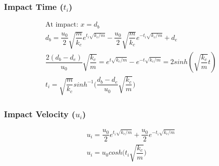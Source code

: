 \documentclass[10pt,a4paper,titlepage]{report}
\begin{document}
\subsubsection{Impact Time ($t_i$)}
\begin{align*}
&\text{At impact: } x = d_b \\
&d_b = \dfrac{u_0}{2} \sqrt{\dfrac{m}{k_c}} e^{t_i \sqrt{k_c / m}} - \dfrac{u_0}{2} \sqrt{\dfrac{m}{k_c}} e^{- t_i \sqrt{k_c / m}} + d_e \\
&\dfrac{2(d_b - d_e)}{u_0} \sqrt{\dfrac{k_c}{m}} = e^{t \sqrt{k_c / m}} - e^{-t \sqrt{k_c / m}}  = 2 sinh(\sqrt{\dfrac{k_c}{m}} t) \\
&t_i = \sqrt{\dfrac{m}{k_c}} sinh^{-1}\Bigg(\dfrac{d_b - d_e}{u_0} \sqrt{\dfrac{k_c}{m}}\Bigg)
\end{align*}
\subsubsection{Impact Velocity ($u_i$)}
\begin{align*}
&u_i = \dfrac{u_0}{2} e^{t_i \sqrt{k_c / m}} + \dfrac{u_0}{2} e^{- t_i \sqrt{k_c / m}} \\
&u_i = u_0 cosh\Big(t_i \sqrt{\dfrac{k_c}{m}}\Big) \\
\end{align*}
\end{document}

